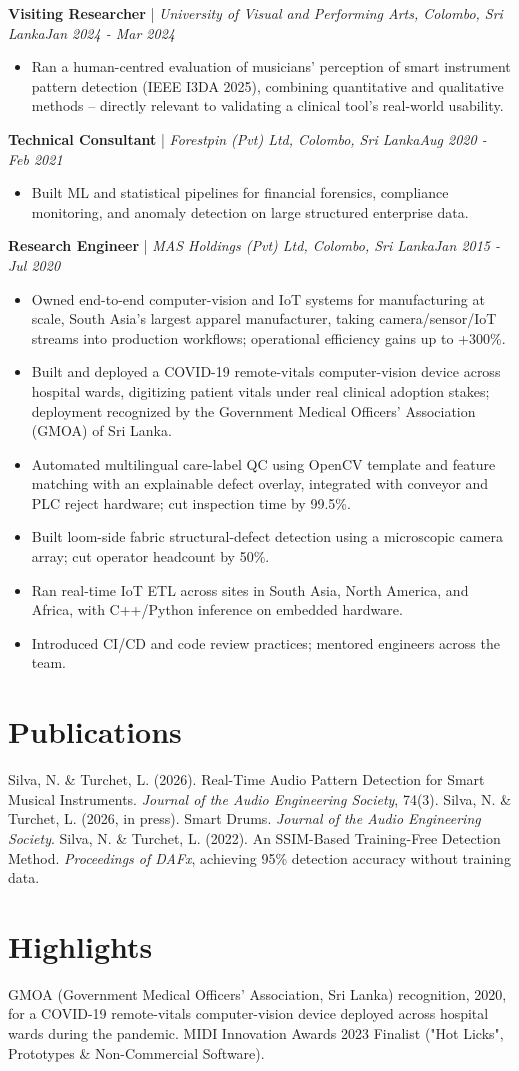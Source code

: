 \documentclass[11pt]{article}
\newenvironment{cvrole}[5]{%
  \par\noindent\textbf{\large #1} | \textit{\small #2, #3}\hfill \textit{\small #4 - #5}\par
  \begin{itemize}[leftmargin=2em, itemsep=-0.3em, topsep=-0.5em]%
}{%
  \end{itemize}\par\noindent\mbox{}\par\vspace{0.1em}%
}
\begin{document}
\begin{cvrole}{Visiting Researcher}{University of Visual and Performing Arts}{Colombo, Sri Lanka}{Jan 2024}{Mar 2024}
\item Ran a human-centred evaluation of musicians' perception of smart instrument pattern detection (IEEE I3DA 2025), combining quantitative and qualitative methods -- directly relevant to validating a clinical tool's real-world usability.
\end{cvrole}

\begin{cvrole}{Technical Consultant}{Forestpin (Pvt) Ltd}{Colombo, Sri Lanka}{Aug 2020}{Feb 2021}
\item Built ML and statistical pipelines for financial forensics, compliance monitoring, and anomaly detection on large structured enterprise data.
\end{cvrole}

\begin{cvrole}{Research Engineer}{MAS Holdings (Pvt) Ltd}{Colombo, Sri Lanka}{Jan 2015}{Jul 2020}
\item Owned end-to-end computer-vision and IoT systems for manufacturing at scale, South Asia's largest apparel manufacturer, taking camera/sensor/IoT streams into production workflows; operational efficiency gains up to +300\%.
\item Built and deployed a COVID-19 remote-vitals computer-vision device across hospital wards, digitizing patient vitals under real clinical adoption stakes; deployment recognized by the Government Medical Officers' Association (GMOA) of Sri Lanka.
\item Automated multilingual care-label QC using OpenCV template and feature matching with an explainable defect overlay, integrated with conveyor and PLC reject hardware; cut inspection time by 99.5\%.
\item Built loom-side fabric structural-defect detection using a microscopic camera array; cut operator headcount by 50\%.
\item Ran real-time IoT ETL across sites in South Asia, North America, and Africa, with C++/Python inference on embedded hardware.
\item Introduced CI/CD and code review practices; mentored engineers across the team.
\end{cvrole}

\section*{Publications}
Silva, N. \& Turchet, L. (2026). Real-Time Audio Pattern Detection for Smart Musical Instruments. \textit{Journal of the Audio Engineering Society}, 74(3). Silva, N. \& Turchet, L. (2026, in press). Smart Drums. \textit{Journal of the Audio Engineering Society}. Silva, N. \& Turchet, L. (2022). An SSIM-Based Training-Free Detection Method. \textit{Proceedings of DAFx}, achieving 95\% detection accuracy without training data.

\section*{Highlights}
GMOA (Government Medical Officers' Association, Sri Lanka) recognition, 2020, for a COVID-19 remote-vitals computer-vision device deployed across hospital wards during the pandemic. MIDI Innovation Awards 2023 Finalist ("Hot Licks", Prototypes \& Non-Commercial Software).
\end{document}
